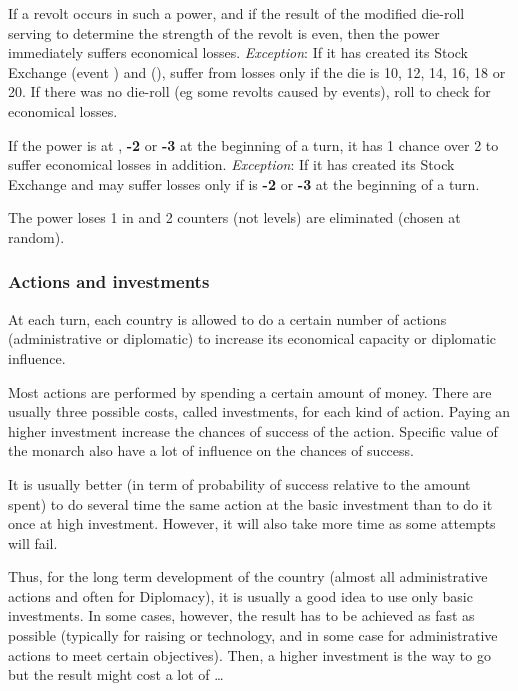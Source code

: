 \aparag If a revolt occurs in such a power, and if the result of the modified
die-roll serving to determine the strength of the revolt is even, then the
power immediately suffers economical losses.
\bparag \textit{Exception}: If it has created its Stock Exchange \HOL
(event ) and \ENG
(), suffer from losses only if the die
is %
10, 12, 14, 16, 18 or 20.
\bparag If there was no die-roll (eg some revolts caused by events), roll to
check for economical losses.

\aparag If the power is at , {\bf -2} or {\bf -3} at the
beginning of a turn, it has 1 chance over 2 to suffer economical losses in
addition.
\bparag \textit{Exception}: If it has created its Stock Exchange \HOL and \ENG
may suffer losses only if \STAB is {\bf -2} or {\bf -3} at the beginning of a
turn.

The power loses 1 in \STAB and 2 \MNU counters (not levels) are eliminated
(chosen at random).


\subsubsection{Actions and investments}
\aparag At each turn, each country is allowed to do a certain number of
actions (administrative or diplomatic) to increase its economical capacity or
diplomatic influence.

\aparag Most actions are performed by spending a certain amount of
money. There are usually three possible costs, called investments, for each
kind of action.
\bparag Paying an higher investment increase the chances of success of the
action.
\bparag Specific value of the monarch also have a lot of influence on the
chances of success.

\begin{playtip}
  It is usually better (in term of probability of success relative to the
  amount spent) to do several time the same action at the basic investment
  than to do it once at high investment. However, it will also take more time
  as some attempts will fail.

  Thus, for the long term development of the country (almost all
  administrative actions and often for Diplomacy), it is usually a good idea
  to use only basic investments. In some cases, however, the result has to be
  achieved as fast as possible (typically for raising \STAB or technology, and
  in some case for administrative actions to meet certain objectives). Then, a
  higher investment is the way to go but the result might cost a lot of
  \ducats\ldots
\end{playtip}

